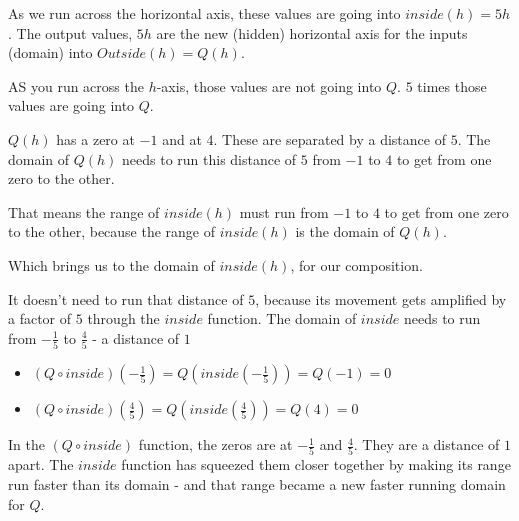\documentclass{ximera}
\begin{document}
As we run across the horizontal axis, these values are going into $inside(h) = 5h$.  The output values, $5h$ are the new (hidden) horizontal axis for the inputs (domain) into $Outside(h) = Q(h)$.

AS you run across the $h$-axis, those values are not going into $Q$.  $5$ times those values are going into $Q$.





\begin{observation}






$Q(h)$ has a zero at $-1$ and at $4$.  These are separated by a distance of $5$. The domain of $Q(h)$ needs to run this distance of $5$ from $-1$ to $4$ to get from one zero to the other.


That means the range of $inside(h)$ must run from  $-1$ to $4$ to get from one zero to the other, because the range of $inside(h)$ is the domain of $Q(h)$.

Which brings us to the domain of $inside(h)$, for our composition. 

It doesn't need to run that distance of $5$, because its movement gets amplified by a factor of $5$ through the $inside$ function.  The domain of $inside$ needs to run from $-\frac{1}{5}$ to $\frac{4}{5}$ - a distance of $1$




\begin{itemize}
\item $(Q \circ inside)\left(-\frac{1}{5}\right) = Q\left(inside\left(-\frac{1}{5}\right)\right) = Q(-1) = 0$
\item $(Q \circ inside)\left(\frac{4}{5}\right) = Q\left(inside\left(\frac{4}{5}\right)\right) = Q(4) = 0$
\end{itemize}


In the $(Q \circ inside)$ function, the zeros are at $-\frac{1}{5}$ and $\frac{4}{5}$.  They are a distance of $1$ apart.  The $inside$ function has squeezed them closer together by making its range run faster than its domain - and that range became a new faster running domain for $Q$.




\end{observation}
\end{document}

